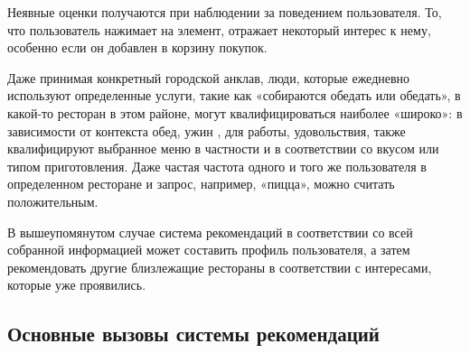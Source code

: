 Неявные оценки получаются при наблюдении за поведением пользователя. То, что пользователь нажимает на элемент, отражает некоторый интерес к нему, особенно если он добавлен в корзину покупок.

Даже принимая конкретный городской анклав, люди, которые ежедневно используют определенные услуги, такие как «собираются обедать или обедать», в какой-то ресторан в этом районе, могут квалифицироваться наиболее «широко»: в зависимости от контекста {обед, ужин} , {для работы, удовольствия}, также квалифицируют выбранное меню {в частности} и в соответствии со вкусом или типом приготовления. Даже частая частота одного и того же пользователя в определенном ресторане и запрос, например, «пицца», можно считать положительным.

В вышеупомянутом случае система рекомендаций в соответствии со всей собранной информацией может составить профиль пользователя, а затем рекомендовать другие близлежащие рестораны в соответствии с интересами, которые уже проявились. 



\subsection{Основные вызовы системы рекомендаций}


